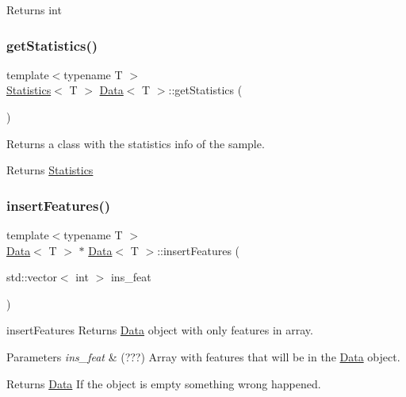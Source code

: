 \begin{DoxyReturn}{Returns}
int 
\end{DoxyReturn}
\mbox{\label{class_data_a7ca936cd8cbde912283f5feee441717a}} 
\subsubsection{\texorpdfstring{get\+Statistics()}{getStatistics()}}
{\footnotesize\ttfamily template$<$typename T $>$ \\
\mbox{\hyperlink{class_statistics}{Statistics}}$<$ T $>$ \mbox{\hyperlink{class_data}{Data}}$<$ T $>$\+::get\+Statistics (\begin{DoxyParamCaption}{ }\end{DoxyParamCaption})}



Returns a class with the statistics info of the sample. 

\begin{DoxyReturn}{Returns}
\mbox{\hyperlink{class_statistics}{Statistics}} 
\end{DoxyReturn}
\mbox{\label{class_data_adfd307ae8437b7b2da4372eb604a2c43}} 
\subsubsection{\texorpdfstring{insert\+Features()}{insertFeatures()}}
{\footnotesize\ttfamily template$<$typename T $>$ \\
\mbox{\hyperlink{class_data}{Data}}$<$ T $>$ $\ast$ \mbox{\hyperlink{class_data}{Data}}$<$ T $>$\+::insert\+Features (\begin{DoxyParamCaption}\item[{std\+::vector$<$ int $>$}]{ins\+\_\+feat }\end{DoxyParamCaption})}



insert\+Features Returns \mbox{\hyperlink{class_data}{Data}} object with only features in array. 


\begin{DoxyParams}{Parameters}
{\em ins\+\_\+feat} & (???) Array with features that will be in the \mbox{\hyperlink{class_data}{Data}} object. \\
\hline
\end{DoxyParams}
\begin{DoxyReturn}{Returns}
\mbox{\hyperlink{class_data}{Data}} If the object is empty something wrong happened. 
\end{DoxyReturn}
\mbox{\label{class_data_a2357782011d11c06500b1d752b9428c6}} 
